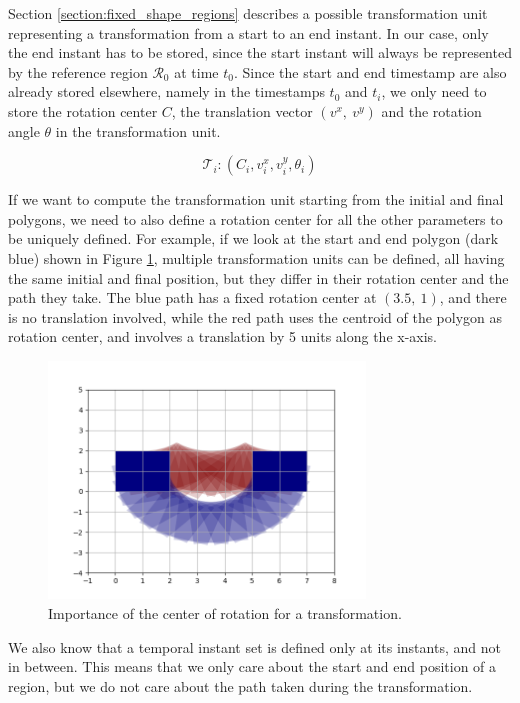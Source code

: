 Section \ref{section:fixed_shape_regions} describes a possible transformation unit representing a transformation from a start to an end instant. In our case, only the end instant has to be stored, since the start instant will always be represented by the reference region $\mathcal{R}_0$ at time $t_{0}$. Since the start and end timestamp are also already stored elsewhere, namely in the timestamps $t_0$ and $t_i$, we only need to store the rotation center $C$, the translation vector $(v^x,\ v^y)$ and the rotation angle $\theta$ in the transformation unit.

\[
    \mathcal{T}_i: (C_i, v_i^x, v_i^y, \theta_i)
\]

If we want to compute the transformation unit starting from the initial and final polygons, we need to also define a rotation center for all the other parameters to be uniquely defined. For example, if we look at the start and end polygon (dark blue) shown in Figure \ref{fig:center_of_rotation}, multiple transformation units can be defined, all having the same initial and final position, but they differ in their rotation center and the path they take. The blue path has a fixed rotation center at $(3.5,\ 1)$, and there is no translation involved, while the red path uses the centroid of the polygon as rotation center, and involves a translation by 5 units along the x-axis.

\begin{figure}[h!]
    \centering
    \includegraphics[width=0.75\textwidth]{images/center_of_rotation_importance.png}
    \caption{Importance of the center of rotation for a transformation.}
    \label{fig:center_of_rotation}
\end{figure}


We also know that a temporal instant set is defined only at its instants, and not in between. This means that we only care about the start and end position of a region, but we do not care about the path taken during the transformation. 

